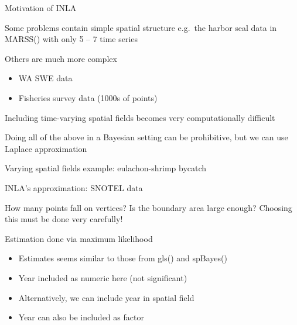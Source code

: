 \documentclass[ignorenonframetext,]{beamer}
\providecommand{\tightlist}{%
  \setlength{\itemsep}{0pt}\setlength{\parskip}{0pt}}
\begin{document}
\begin{frame}{Motivation of INLA}
\protect\hypertarget{motivation-of-inla}{}

Some problems contain simple spatial structure e.g.~the harbor seal data
in MARSS() with only 5 -- 7 time series

Others are much more complex

\begin{itemize}
\tightlist
\item
  WA SWE data
\item
  Fisheries survey data (1000s of points)
\end{itemize}

Including time-varying spatial fields becomes very computationally
difficult

Doing all of the above in a Bayesian setting can be prohibitive, but we
can use Laplace approximation

\end{frame}

\begin{frame}{Varying spatial fields example: eulachon-shrimp bycatch}
\protect\hypertarget{varying-spatial-fields-example-eulachon-shrimp-bycatch}{}

\end{frame}

\begin{frame}{INLA's approximation: SNOTEL data}
\protect\hypertarget{inlas-approximation-snotel-data}{}

How many points fall on vertices? Is the boundary area large enough?
Choosing this must be done very carefully!

\end{frame}

\begin{frame}{Estimation done via maximum likelihood}
\protect\hypertarget{estimation-done-via-maximum-likelihood}{}

\begin{itemize}
\tightlist
\item
  Estimates seems similar to those from gls() and spBayes()
\item
  Year included as numeric here (not significant)
\item
  Alternatively, we can include year in spatial field
\item
  Year can also be included as factor
\end{itemize}

\end{frame}
\end{document}
